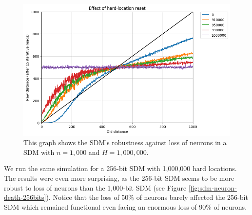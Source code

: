 \begin{figure}[!p]
\centering\includegraphics[width=\textwidth]{images02/new-images/sdm-neuron-death.png}
\caption{This graph shows the SDM's robustness against loss of neurons in a SDM with $n=1,000$ and $H=1,000,000$.
\label{fig:sdm-neuron-death-details}}
\end{figure}

We run the same simulation for a 256-bit SDM with 1,000,000 hard locations. The results were even more surprising, as the 256-bit SDM seems to be more robust to loss of neurons than the 1,000-bit SDM (see Figure \ref{fig:sdm-neuron-death-256bits}). Notice that the loss of 50\% of neurons barely affected the 256-bit SDM which remained functional even facing an enormous loss of 90\% of neurons.

